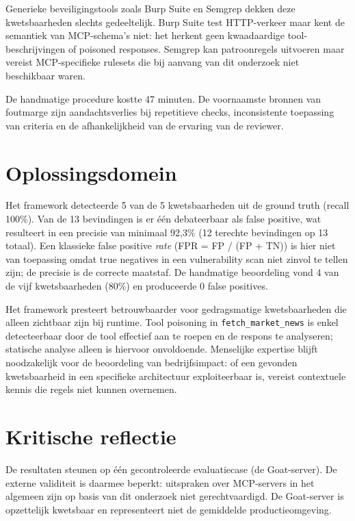 Generieke beveiligingstools zoals Burp Suite en Semgrep dekken deze kwetsbaarheden slechts gedeeltelijk. Burp Suite test HTTP-verkeer maar kent de semantiek van MCP-schema's niet: het herkent geen kwaadaardige tool-beschrijvingen of poisoned responses. Semgrep kan patroonregels uitvoeren maar vereist MCP-specifieke rulesets die bij aanvang van dit onderzoek niet beschikbaar waren.

De handmatige procedure kostte 47 minuten. De voornaamste bronnen van foutmarge zijn aandachtsverlies bij repetitieve checks, inconsistente toepassing van criteria en de afhankelijkheid van de ervaring van de reviewer.

\section{Oplossingsdomein}

Het framework detecteerde 5 van de 5 kwetsbaarheden uit de ground truth (recall 100\%). Van de 13 bevindingen is er één debateerbaar als false positive, wat resulteert in een precisie van minimaal 92{,}3\% (12 terechte bevindingen op 13 totaal). Een klassieke false positive \emph{rate} (FPR = FP / (FP + TN)) is hier niet van toepassing omdat true negatives in een vulnerability scan niet zinvol te tellen zijn; de precisie is de correcte maatstaf. De handmatige beoordeling vond 4 van de vijf kwetsbaarheden (80\%) en produceerde 0 false positives.

Het framework presteert betrouwbaarder voor gedragsmatige kwetsbaarheden die alleen zichtbaar zijn bij runtime. Tool poisoning in \texttt{fetch\_market\_news} is enkel detecteerbaar door de tool effectief aan te roepen en de respons te analyseren; statische analyse alleen is hiervoor onvoldoende. Menselijke expertise blijft noodzakelijk voor de beoordeling van bedrijfsimpact: of een gevonden kwetsbaarheid in een specifieke architectuur exploiteerbaar is, vereist contextuele kennis die regels niet kunnen overnemen.

\section{Kritische reflectie}

De resultaten steunen op één gecontroleerde evaluatiecase (de Goat-server). De externe validiteit is daarmee beperkt: uitspraken over MCP-servers in het algemeen zijn op basis van dit onderzoek niet gerechtvaardigd. De Goat-server is opzettelijk kwetsbaar en representeert niet de gemiddelde productieomgeving.

